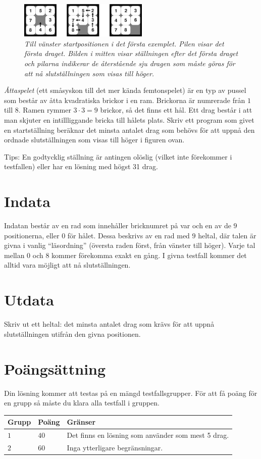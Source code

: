 
\begin{figure}[!h]
	\centering
	\includegraphics[width=0.55\textwidth]{figur}
	\caption{\emph{Till vänster startpositionen i det första exemplet. Pilen visar det första draget. Bilden i mitten visar ställningen efter det första draget och pilarna indikerar de återstående sju dragen som måste göras för att nå slutställningen som visas till höger.}}
\end{figure}


\emph{Åttaspelet} (ett småsyskon till det mer kända femtonspelet) är en typ av pussel som består av åtta kvadratiska brickor i en ram. Brickorna är numrerade från $1$ till $8$. Ramen rymmer $3\cdot3=9$ brickor, så det finns ett hål. Ett drag består i att man skjuter en intillliggande bricka till hålets plats. Skriv ett program som givet en startställning beräknar det minsta antalet drag som behövs för att uppnå den ordnade slutställningen som visas till höger i figuren ovan.

Tips: En godtycklig ställning är antingen olöslig (vilket inte förekommer i testfallen) eller har en lösning med högst 31 drag.

\section*{Indata}
Indatan består av en rad som innehåller bricknumret på var och en av de $9$ positionerna, eller $0$ för hålet.
Dessa beskrivs av en rad med $9$ heltal, där talen är givna i vanlig ``läsordning'' (översta raden först, från vänster till höger).
Varje tal mellan $0$ och $8$ kommer förekomma exakt en gång. I givna testfall kommer det alltid vara möjligt att nå slutställningen.

\section*{Utdata}
Skriv ut ett heltal: det minsta antalet drag som krävs för att uppnå slutställningen utifrån den givna positionen.

\section*{Poängsättning}
Din lösning kommer att testas på en mängd testfallsgrupper.
För att få poäng för en grupp så måste du klara alla testfall i gruppen.

\noindent
\begin{tabular}{| l | l | p{12cm} |}
  \hline
  \textbf{Grupp} & \textbf{Poäng} & \textbf{Gränser} \\ \hline
  $1$    & $40$          & Det finns en lösning som använder som mest 5 drag.  \\ \hline
  $2$    & $60$          & Inga ytterligare begränsningar.  \\ \hline
\end{tabular}
